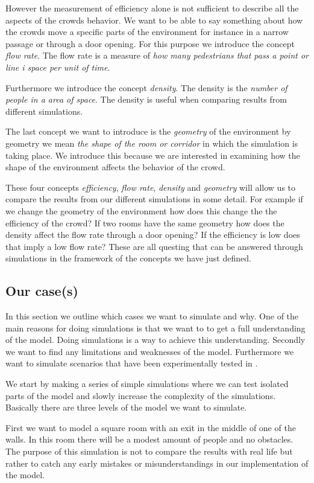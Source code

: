 However the measurement of efficiency alone is not sufficient to describe all 
the aspects of the crowds behavior. We want to be able to say something about 
how the crowds move a specific parts of the environment for instance in a 
narrow passage or through a door opening. For this purpose we introduce the 
concept \emph{flow rate}. The flow rate is a measure of \emph{how many pedestrians 
that pass a point or line i space per unit of time}.

Furthermore we introduce the concept \emph{density}. The density is the \emph{number 
of people in a area of space}. The density is useful when comparing results from 
different simulations. 

The last concept we want to introduce is the \emph{geometry} of the environment 
by geometry we mean \emph{the shape of the room or corridor} in which the simulation 
is taking place. We introduce this because we are interested in examining how 
the shape of the environment affects the behavior of the crowd.

These four concepts \emph{efficiency}, \emph{flow rate}, \emph{density} and 
\emph{geometry} will allow us to compare the results from our different simulations 
in some detail. For example if we change the geometry of the environment how does 
this change the the efficiency of the crowd? If two rooms have the same geometry 
how does the density affect the flow rate through a door opening? If the efficiency 
is low does that imply a low flow rate? These are all questing that can be answered 
through simulations in the framework of the concepts we have just defined.    

\subsection{Our case(s)}
In this section we outline which cases we want to simulate and why.
One of the main reasons for doing simulations is that we want to to get 
a full understanding of the model. Doing simulations is a way to achieve this
understanding. Secondly we want to find any limitations and weaknesses of the 
model. Furthermore we want to simulate scenarios that have been experimentally 
tested in \citep{self-org}.

We start by making a series of simple simulations  where we can test isolated parts 
of the model and slowly increase the complexity of the simulations. Basically there 
are three levels of the model we want to simulate. 

First we want to model a square room with an exit in the middle of one of the walls. 
In this room there will be a modest amount of people and no obstacles. The purpose of 
this simulation is not to compare the results with real life but rather to catch any 
early mistakes or misunderstandings in our implementation of the model.

